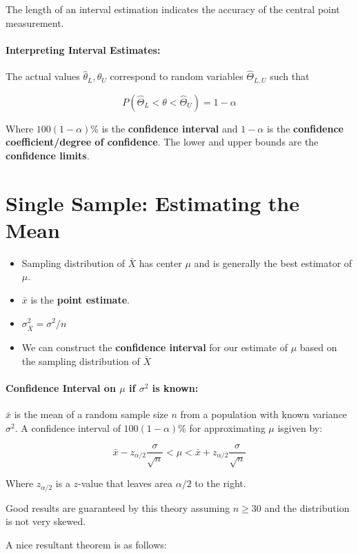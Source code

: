 \documentclass[a4paper,12pt]{report}
\begin{document}
The length of an interval estimation indicates the accuracy of the central point measurement. 

\paragraph{Interpreting Interval Estimates: } The actual values $\hat{\theta}_L, \hat{\theta}_U$ correspond to random variables $\hat{\Theta}_{L,U}$ such that 

$$P(\hat{\Theta}_L < \theta < \hat{\Theta}_U) = 1-\alpha$$

Where $100(1-\alpha)$\% is the \textbf{confidence interval} and $1-\alpha$ is the \textbf{confidence coefficient/degree of confidence}. The lower and upper bounds are the \textbf{confidence limits}. 

\section{Single Sample: Estimating the Mean}
\begin{itemize}
\item Sampling distribution of $\bar{X}$ has center $\mu$ and is generally the best estimator of $\mu$. 
\item $\bar{x}$ is the \textbf{point estimate}. 
\item $\sigma_{\bar{X}}^2 = \sigma^2/n$
\item We can construct the \textbf{confidence interval} for our estimate of $\mu$ based on the sampling distribution of $\bar{X}$
\end{itemize}

\paragraph{Confidence Interval on $\mu$ if $\sigma^2$ is known: } $\bar{x}$ is the mean of a random sample size $n$ from a population with known variance $\sigma^2$. A confidence interval of $100(1-\alpha)$\% for approximating $\mu$ isgiven by: 

$$\bar{x} - z_{\alpha/2}\frac{\sigma}{\sqrt{n}} < \mu < \bar{x} + z_{\alpha/2} \frac{\sigma}{\sqrt{n}}$$

Where $z_{\alpha/2}$ is a $z$-value that leaves area $\alpha/2$ to the right.

Good results are guaranteed by this theory assuming $n \geq 30$ and the distribution is not very skewed.

A nice resultant theorem is as follows: 
\end{document}
